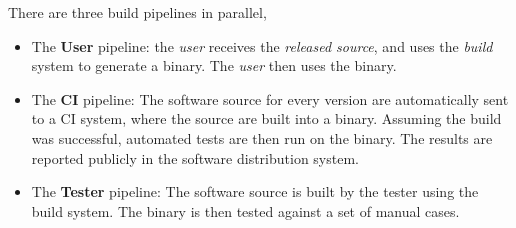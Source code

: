 There are three build pipelines in parallel,
\begin{itemize}
\item The \textbf{User} pipeline: the \emph{user} receives the \emph{released
    source}, and uses the \emph{build} system to generate a binary. The
    \emph{user} then uses the binary.
  \item The \textbf{\gls{CI}} pipeline: The software source for every version
    are automatically sent to a \gls{CI} system, where the source are built into
    a binary. Assuming the build was successful, automated tests are then run
    on the binary. The results are reported publicly in the software
    distribution system.
  \item The \textbf{Tester} pipeline: The software source is built by the tester
    using the build system. The binary is then tested against a set of manual
    cases.
\end{itemize}
